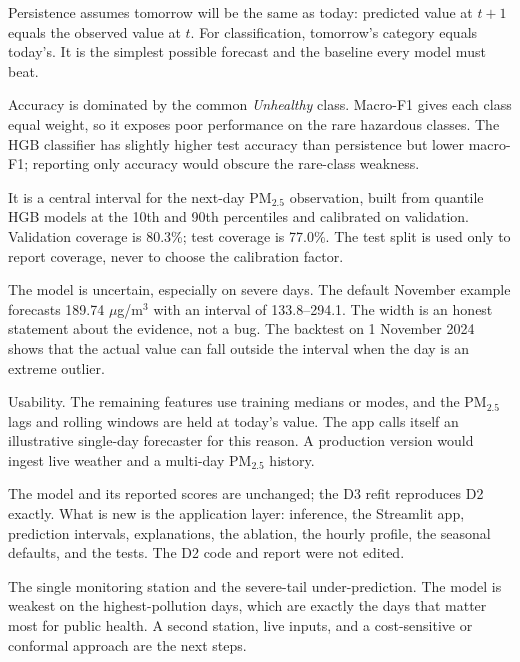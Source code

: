 \begin{description}[leftmargin=1.2em,style=nextline,itemsep=4pt]
  \item[What is persistence?]
  Persistence assumes tomorrow will be the same as today: predicted value at
  $t+1$ equals the observed value at $t$. For classification, tomorrow's
  category equals today's. It is the simplest possible forecast and the baseline
  every model must beat.

  \item[Why macro-F1 instead of accuracy?]
  Accuracy is dominated by the common \emph{Unhealthy} class. Macro-F1 gives each
  class equal weight, so it exposes poor performance on the rare hazardous
  classes. The HGB classifier has slightly higher test accuracy than persistence
  but lower macro-F1; reporting only accuracy would obscure the rare-class
  weakness.

  \item[What does the 80\% interval mean?]
  It is a central interval for the next-day PM$_{2.5}$ observation, built from
  quantile HGB models at the 10th and 90th percentiles and calibrated on
  validation. Validation coverage is 80.3\%; test coverage is 77.0\%. The test
  split is used only to report coverage, never to choose the calibration factor.

  \item[Why is the interval so wide?]
  The model is uncertain, especially on severe days. The default November
  example forecasts 189.74 $\mu$g/m$^3$ with an interval of 133.8--294.1. The
  width is an honest statement about the evidence, not a bug. The backtest on
  1 November 2024 shows that the actual value can fall outside the interval when
  the day is an extreme outlier.

  \item[Why only six inputs?]
  Usability. The remaining features use training medians or modes, and the
  PM$_{2.5}$ lags and rolling windows are held at today's value. The app calls
  itself an illustrative single-day forecaster for this reason. A production
  version would ingest live weather and a multi-day PM$_{2.5}$ history.

  \item[What changed after Deliverable 2?]
  The model and its reported scores are unchanged; the D3 refit reproduces D2
  exactly. What is new is the application layer: inference, the Streamlit app,
  prediction intervals, explanations, the ablation, the hourly profile, the
  seasonal defaults, and the tests. The D2 code and report were not edited.

  \item[What is the biggest limitation?]
  The single monitoring station and the severe-tail under-prediction. The model
  is weakest on the highest-pollution days, which are exactly the days that
  matter most for public health. A second station, live inputs, and a
  cost-sensitive or conformal approach are the next steps.
\end{description}

